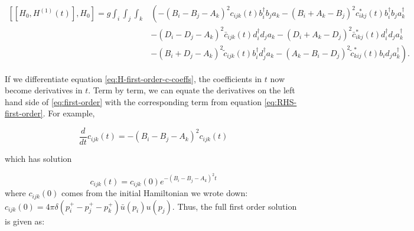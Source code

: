 \begin{align}
    \label{eq:RHS-first-order}
    \left[\left[H_0, H^{(1)}(t) \right], H_0\right] = g\int_i \int_j \int_k &\left(-\left(B_i - B_j - A_k \right)^2c_{ijk}(t)b_i^\dagger b_j a_k - \left(B_i + A_k - B_j\right)^2c_{ikj}^*(t) b_i^\dagger b_j a_k^\dagger \right. \\ \nonumber
    &\left. - \left(D_i - D_j - A_k \right)^2\bar c_{ijk}(t) d_i^\dagger d_j a_k -\left(D_i + A_k - D_j\right)^2\bar c^*_{ikj}(t) d^\dagger_i d_j a_k^\dagger\right. \\ \nonumber
    & \left.  - \left(B_i + D_j - A_k\right)^2\tilde c_{ijk}(t)b_i^\dagger d_j^\dagger a_k - \left(A_k - B_i - D_j \right)^2\tilde c^*_{kij}(t) b_i d_j a_k^\dagger \right).
\end{align}

If we differentiate equation \ref{eq:H-first-order-c-coeffs}, the coefficients in $t$ now become derivatives in $t$.
Term by term, we can equate the derivatives on the left hand side of \ref{eq:first-order} with the corresponding term from equation \ref{eq:RHS-first-order}.
For example, 

\begin{equation}
    \frac{d}{dt}c_{ijk}(t) = -\left(B_i - B_j - A_k \right)^2 c_{ijk}(t)
\end{equation}

which has solution 

\begin{equation}
    c_{ijk}(t) = c_{ijk}(0)e^{-\left(B_i - B_j - A_k \right)^2t}
\end{equation}
where $c_{ijk}(0)$ comes from the initial Hamiltonian we wrote down: $c_{ijk}(0) = 4\pi \delta\left(p_i^+ - p_j^+ - p_k^+ \right)\bar u(p_i) u(p_j)$.
Thus, the full first order solution is given as:
 
